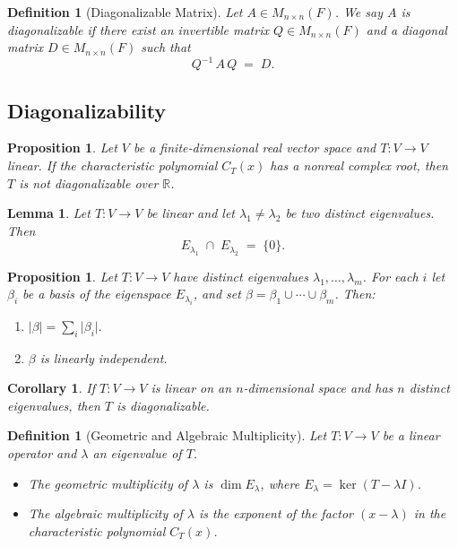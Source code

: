 \documentclass[12pt]{article}
\theoremstyle{break}             %
\newtheorem{prop}[thm]{Proposition}%
\newtheorem{cor}[thm]{Corollary}
\newtheorem{lem}[thm]{Lemma}
\newtheorem{defn}[thm]{Definition}
\begin{document}
\begin{defn}[Diagonalizable Matrix]
Let \(A\in M_{n\times n}(F)\).  We say \(A\) is \emph{diagonalizable} if there exist an invertible matrix \(Q\in M_{n\times n}(F)\) and a diagonal matrix \(D\in M_{n\times n}(F)\) such that
\[
Q^{-1}\,A\,Q \;=\; D.
\]
\end{defn}

\subsection{Diagonalizability}
\begin{prop}
Let \(V\) be a finite‐dimensional real vector space and \(T:V\to V\) linear.  If the characteristic polynomial \(C_T(x)\) has a nonreal complex root, then \(T\) is not diagonalizable over \(\mathbb R\).
\end{prop}

\begin{lem}
Let \(T:V\to V\) be linear and let \(\lambda_1\neq\lambda_2\) be two distinct eigenvalues.  Then
\[
E_{\lambda_1}\;\cap\;E_{\lambda_2} \;=\;\{0\}.
\]
\end{lem}

\begin{prop}
Let \(T:V\to V\) have distinct eigenvalues \(\lambda_1,\dots,\lambda_m\).  For each \(i\) let \(\beta_i\) be a basis of the eigenspace \(E_{\lambda_i}\), and set \(\beta=\beta_1\cup\cdots\cup\beta_m\).  Then:
\begin{enumerate}
  \item \(\lvert\beta\rvert = \sum_i \lvert\beta_i\rvert.\)
  \item \(\beta\) is linearly independent.
\end{enumerate}
\end{prop}

\begin{cor}
If \(T:V\to V\) is linear on an \(n\)-dimensional space and has \(n\) distinct eigenvalues, then \(T\) is diagonalizable.
\end{cor}

\begin{defn}[Geometric and Algebraic Multiplicity]
Let \(T\colon V\to V\) be a linear operator and \(\lambda\) an eigenvalue of \(T\).  
\begin{itemize}
  \item The \emph{geometric multiplicity} of \(\lambda\) is \(\dim E_\lambda\), where \(E_\lambda=\ker(T-\lambda I)\).
  \item The \emph{algebraic multiplicity} of \(\lambda\) is the exponent of the factor \((x-\lambda)\) in the characteristic polynomial \(C_T(x)\).
\end{itemize}
\end{defn}
\end{document}

